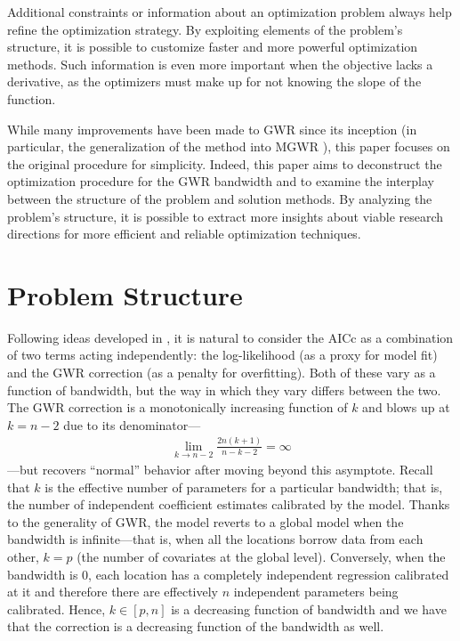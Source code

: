 \documentclass[letterpaper,12pt,twocolumn]{article}
\begin{document}
Additional constraints or information about an optimization problem always help refine the optimization strategy. By exploiting elements of the problem's structure, it is possible to customize faster and more powerful optimization methods. Such information is even more important when the objective lacks a derivative, as the optimizers must make up for not knowing the slope of the function.

While many improvements have been made to GWR since its inception (in particular, the generalization of the method into MGWR \cite{Oshan2019}), this paper focuses on the original procedure for simplicity. Indeed, this paper aims to deconstruct the optimization procedure for the GWR bandwidth and to examine the interplay between the structure of the problem and solution methods. By analyzing the problem's structure, it is possible to extract more insights about viable research directions for more efficient and reliable optimization techniques.

\section{Problem Structure}
\label{sec:problem}
Following ideas developed in \cite{Hoffman2021}, it is natural to consider the AICc as a combination of two terms acting independently: the log-likelihood (as a proxy for model fit) and the GWR correction (as a penalty for overfitting). Both of these vary as a function of bandwidth, but the way in which they vary differs between the two. The GWR correction is a monotonically increasing function of $k$ and blows up at $k = n-2$ due to its denominator--- \begin{align*}
    \lim_{k\rightarrow n-2} \frac{2n(k+1)}{n-k-2} = \infty
\end{align*} ---but recovers ``normal'' behavior after moving beyond this asymptote. Recall that $k$ is the effective number of parameters for a particular bandwidth; that is, the number of independent coefficient estimates calibrated by the model. Thanks to the generality of GWR, the model reverts to a global model when the bandwidth is infinite---that is, when all the locations borrow data from each other, $k = p$ (the number of covariates at the global level). Conversely, when the bandwidth is 0, each location has a completely independent regression calibrated at it and therefore there are effectively $n$ independent parameters being calibrated. Hence, $k \in [p, n]$ is a decreasing function of bandwidth and we have that the correction is a decreasing function of the bandwidth as well.
\end{document}
